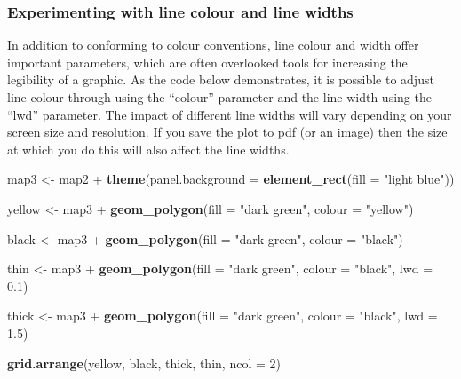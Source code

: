 \documentclass[]{article}
\newenvironment{Shaded}{}{}
\newcommand{\KeywordTok}[1]{\textcolor[rgb]{0.00,0.44,0.13}{\textbf{{#1}}}}
\newcommand{\DataTypeTok}[1]{\textcolor[rgb]{0.56,0.13,0.00}{{#1}}}
\newcommand{\DecValTok}[1]{\textcolor[rgb]{0.25,0.63,0.44}{{#1}}}
\newcommand{\FloatTok}[1]{\textcolor[rgb]{0.25,0.63,0.44}{{#1}}}
\newcommand{\StringTok}[1]{\textcolor[rgb]{0.25,0.44,0.63}{{#1}}}
\newcommand{\NormalTok}[1]{{#1}}
\begin{document}
\subsubsection{Experimenting with line colour and line widths}

In addition to conforming to colour conventions, line colour and width
offer important parameters, which are often overlooked tools for
increasing the legibility of a graphic. As the code below demonstrates,
it is possible to adjust line colour through using the ``colour''
parameter and the line width using the ``lwd'' parameter. The impact of
different line widths will vary depending on your screen size and
resolution. If you save the plot to pdf (or an image) then the size at
which you do this will also affect the line widths.

\begin{Shaded}
\begin{Highlighting}[]
\NormalTok{map3 <- map2 + }\KeywordTok{theme}\NormalTok{(}\DataTypeTok{panel.background =} \KeywordTok{element_rect}\NormalTok{(}\DataTypeTok{fill =} \StringTok{"light blue"}\NormalTok{))}

\NormalTok{yellow <- map3 + }\KeywordTok{geom_polygon}\NormalTok{(}\DataTypeTok{fill =} \StringTok{"dark green"}\NormalTok{, }\DataTypeTok{colour =} \StringTok{"yellow"}\NormalTok{)}

\NormalTok{black <- map3 + }\KeywordTok{geom_polygon}\NormalTok{(}\DataTypeTok{fill =} \StringTok{"dark green"}\NormalTok{, }\DataTypeTok{colour =} \StringTok{"black"}\NormalTok{)}

\NormalTok{thin <- map3 + }\KeywordTok{geom_polygon}\NormalTok{(}\DataTypeTok{fill =} \StringTok{"dark green"}\NormalTok{, }\DataTypeTok{colour =} \StringTok{"black"}\NormalTok{, }\DataTypeTok{lwd =} \FloatTok{0.1}\NormalTok{)}

\NormalTok{thick <- map3 + }\KeywordTok{geom_polygon}\NormalTok{(}\DataTypeTok{fill =} \StringTok{"dark green"}\NormalTok{, }\DataTypeTok{colour =} \StringTok{"black"}\NormalTok{, }\DataTypeTok{lwd =} \FloatTok{1.5}\NormalTok{)}

\KeywordTok{grid.arrange}\NormalTok{(yellow, black, thick, thin, }\DataTypeTok{ncol =} \DecValTok{2}\NormalTok{)}
\end{Highlighting}
\end{Shaded}
\end{document}
